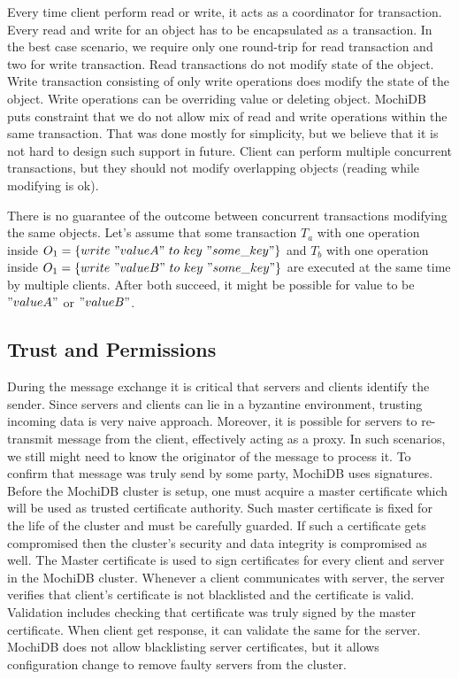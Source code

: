 \documentclass[letterpaper,twocolumn,10pt]{article}
\begin{document}
Every time client perform read or write, it acts as a coordinator for transaction. Every read and write for an object has to be encapsulated as a transaction. In the best case scenario, we require only one round-trip for read transaction and two for write transaction. Read transactions do not modify state of the object. Write transaction consisting of only write operations does modify the state of the object. Write operations can be overriding value or deleting object. MochiDB puts constraint that we do not allow mix of read and write operations within the same transaction. That was done mostly for simplicity, but we believe that it is not hard to design such support in future. Client can perform multiple concurrent transactions, but they should not modify overlapping objects (reading while modifying is ok).

There is no guarantee of the outcome between concurrent transactions modifying the same objects. Let's assume that some transaction $T_{a}$ with one operation inside $O_{1} = \{write\ "valueA"\ to\ key\ "some\_key" \}$ and $T_{b}$ with one operation inside $O_{1} = \{write\ "valueB"\ to\ key\ "some\_key" \}$ are executed at the same time by multiple clients. After both succeed, it might be possible for value to be $"valueA"$ or $"valueB"$.

\subsection{Trust and Permissions}

During the message exchange it is critical that servers and clients identify the sender. Since servers and clients can lie in a byzantine environment, trusting incoming data is very naive approach. Moreover, it is possible for servers to re-transmit message from the client, effectively acting as a proxy. In such scenarios, we still might need to know the originator of the message to process it. To confirm that message was truly send by some party, MochiDB uses signatures.
Before the MochiDB cluster is setup, one must acquire a master certificate which will be used as trusted certificate authority. Such master certificate is fixed for the life of the cluster and must be carefully guarded. If such a certificate gets compromised then the cluster's security and data integrity is compromised as well. 
The Master certificate is used to sign certificates for every client and server in the MochiDB cluster. Whenever a client communicates with server, the server verifies that client's certificate is not blacklisted and the certificate is valid. Validation includes checking that certificate was truly signed by the master certificate. When client get response, it can validate the same for the server. MochiDB does not allow blacklisting server certificates, but it allows configuration change to remove faulty servers from the cluster.
\end{document}

